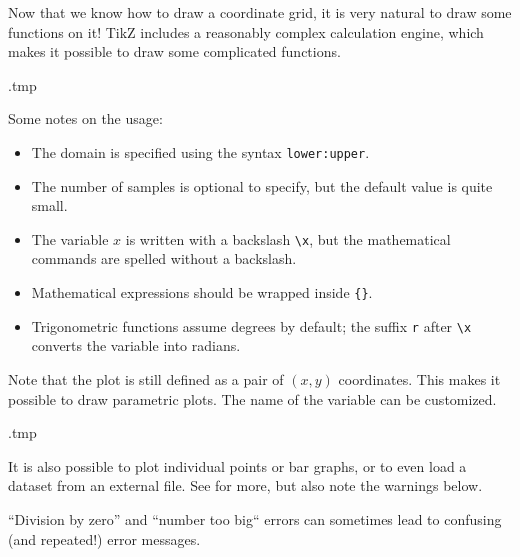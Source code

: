 Now that we know how to draw a coordinate grid,
it is very natural to draw some functions on it!
TikZ includes a reasonably complex calculation engine,
which makes it possible to draw some complicated functions.
%
\begin{VerbatimOut}{\jobname.tmp}
\centering
{}
\end{VerbatimOut}
\ShowExampleBelow[2]
Some notes on the usage:
\begin{itemize}
\item The domain is specified using the syntax \verb|lower:upper|.
\item The number of samples is optional to specify, but the default value is quite small.
\item The variable $x$ is written with a backslash \verb|\x|,
    but the mathematical commands are spelled without a backslash.
\item Mathematical expressions should be wrapped inside \verb|{}|.
\item Trigonometric functions assume degrees by default;
    the suffix \verb|r| after \verb|\x| converts the variable into radians.
\end{itemize}

Note that the plot is still defined as a pair of $(x,y)$ coordinates.
This makes it possible to draw parametric plots.
The name of the variable can be customized.
%
\begin{VerbatimOut}{\jobname.tmp}
\centering
{}
\end{VerbatimOut}
\ShowExampleBelow[2]

It is also possible to plot individual points or bar graphs,
or to even load a dataset from an external file.
See \cite[Section~22]{tikz} for more,
but also note the warnings below.

\begin{warning}
``Division by zero'' and ``number too big`` errors
can sometimes lead to confusing (and repeated!) error messages.
\end{warning}


